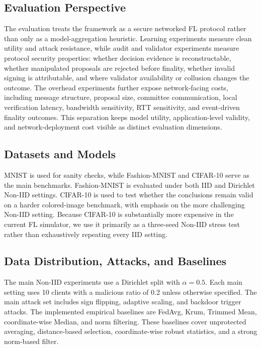 \documentclass[preprint,12pt]{elsarticle}
\begin{document}
\subsection{Evaluation Perspective}

The evaluation treats the framework as a secure networked FL protocol rather than only as a model-aggregation heuristic. Learning experiments measure clean utility and attack resistance, while audit and validator experiments measure protocol security properties: whether decision evidence is reconstructable, whether manipulated proposals are rejected before finality, whether invalid signing is attributable, and where validator availability or collusion changes the outcome. The overhead experiments further expose network-facing costs, including message structure, proposal size, committee communication, local verification latency, bandwidth sensitivity, RTT sensitivity, and event-driven finality outcomes. This separation keeps model utility, application-level validity, and network-deployment cost visible as distinct evaluation dimensions.

\subsection{Datasets and Models}

MNIST is used for sanity checks, while Fashion-MNIST and CIFAR-10 serve as the main benchmarks. Fashion-MNIST is evaluated under both IID and Dirichlet Non-IID settings. CIFAR-10 is used to test whether the conclusions remain valid on a harder colored-image benchmark, with emphasis on the more challenging Non-IID setting. Because CIFAR-10 is substantially more expensive in the current FL simulator, we use it primarily as a three-seed Non-IID stress test rather than exhaustively repeating every IID setting.

\subsection{Data Distribution, Attacks, and Baselines}

The main Non-IID experiments use a Dirichlet split with $\alpha=0.5$. Each main setting uses 10 clients with a malicious ratio of 0.2 unless otherwise specified. The main attack set includes sign flipping, adaptive scaling, and backdoor trigger attacks. The implemented empirical baselines are FedAvg, Krum, Trimmed Mean, coordinate-wise Median, and norm filtering. These baselines cover unprotected averaging, distance-based selection, coordinate-wise robust statistics, and a strong norm-based filter.
\end{document}

